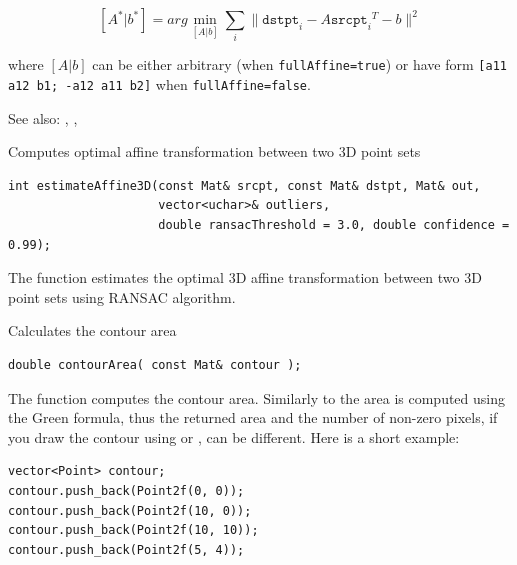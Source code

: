 \begin{description}
\[ [A^*|b^*] = arg \min_{[A|b]} \sum_i \|\texttt{dstpt}_i - A {\texttt{srcpt}_i}^T - b \|^2 \]

where $[A|b]$ can be either arbitrary (when \texttt{fullAffine=true}) or have form \texttt{[a11 a12 b1; -a12 a11 b2]} when \texttt{fullAffine=false}.

See also: , , 

\label{estimateAffine3D}
Computes optimal affine transformation between two 3D point sets

\begin{lstlisting}
int estimateAffine3D(const Mat& srcpt, const Mat& dstpt, Mat& out,
                     vector<uchar>& outliers,
                     double ransacThreshold = 3.0, double confidence = 0.99);
\end{lstlisting}
\begin{description}
\end{description}

The function estimates the optimal 3D affine transformation between two 3D point sets using RANSAC algorithm.


\label{contourArea}
Calculates the contour area

\begin{lstlisting}
double contourArea( const Mat& contour );    
\end{lstlisting}
\begin{description}
\end{description}

The function computes the contour area. Similarly to  the area is computed using the Green formula, thus the returned area and the number of non-zero pixels, if you draw the contour using  or , can be different.
Here is a short example:

\begin{lstlisting}
vector<Point> contour;
contour.push_back(Point2f(0, 0));
contour.push_back(Point2f(10, 0));
contour.push_back(Point2f(10, 10));
contour.push_back(Point2f(5, 4));


\end{lstlisting}
\end{description}
